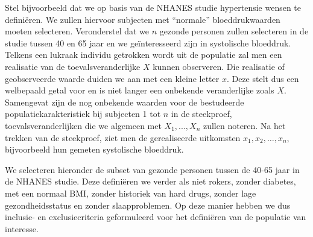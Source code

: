 \documentclass[12pt,dutch,coursenotes]{book}
\theoremstyle{definition}
\theoremstyle{definition}
\theoremstyle{definition}
\theoremstyle{remark}
\begin{document}
Stel bijvoorbeeld dat we op basis van de NHANES studie hypertensie
wensen te definiëren. We zullen hiervoor subjecten met ``normale''
bloeddrukwaarden moeten selecteren. Veronderstel dat we \(n\) gezonde
personen zullen selecteren in de studie tussen 40 en 65 jaar en we
geïnteresseerd zijn in systolische bloeddruk. Telkens een lukraak
individu getrokken wordt uit de populatie zal men een realisatie van de
toevalsveranderlijke \(X\) kunnen observeren. Die realisatie of
geobserveerde waarde duiden we aan met een kleine letter \(x\). Deze
stelt dus een welbepaald getal voor en is niet langer een onbekende
veranderlijke zoals \(X\). Samengevat zijn de nog onbekende waarden voor
de bestudeerde populatiekarakteristiek bij subjecten 1 tot \(n\) in de
steekproef, toevalsveranderlijken die we algemeen met \(X_1,...,X_n\)
zullen noteren. Na het trekken van de steekproef, ziet men de
gerealiseerde uitkomsten \(x_1, x_2, \dots, x_n\), bijvoorbeeld hun
gemeten systolische bloeddruk.

We selecteren hieronder de subset van gezonde personen tussen de 40-65
jaar in de NHANES studie. Deze definiëren we verder als niet rokers,
zonder diabetes, met een normaal BMI, zonder historiek van hard drugs,
zonder lage gezondheidsstatus en zonder slaapproblemen. Op deze manier
hebben we dus inclusie- en exclusiecriteria geformuleerd voor het
definiëren van de populatie van interesse.
\end{document}

